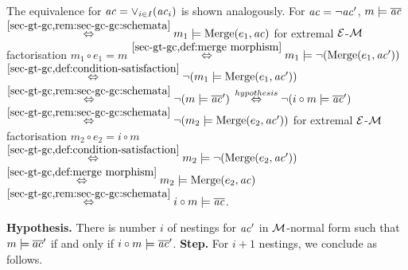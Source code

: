 \begin{description}
The equivalence for $\mathit{ac}=\vee_{i \in I}(\mathit{ac}_i)$ is shown analogously.
For $\mathit{ac}=\neg \mathit{ac}'$, $m \models \overline{\mathit{ac}}$ $\stackrel{\cref{sec-gt-gc,rem:sec-gc-gc:schemata}}{\Leftrightarrow} m_1 \models \Merge(e_1,\ac)$ for extremal $\mathcal{E}$-${\cal M}$ factorisation $m_1 \circ e_1=m$ $\stackrel{\cref{sec-gt-gc,def:merge morphism}}{\Leftrightarrow} m_1 \models \neg(\Merge(e_1,\ac'))$ $\stackrel{\cref{sec-gt-gc,def:condition-satisfaction}}{\Leftrightarrow} \neg(m_1 \models \Merge(e_1,\ac'))$ $\stackrel{\cref{sec-gt-gc,rem:sec-gc-gc:schemata}}{\Leftrightarrow} \neg(m \models \ol{\ac}')$ $\stackrel{hypothesis}{\Leftrightarrow} \neg(i \circ m \models \overline{\mathit{ac}}')$
$\stackrel{\cref{sec-gt-gc,rem:sec-gc-gc:schemata}}{\Leftrightarrow} \neg(m_2 \models \Merge(e_2,\ac'))$ for extremal $\mathcal{E}$-${\cal M}$ factorisation $m_2 \circ e_2=i \circ m$ $\stackrel{\cref{sec-gt-gc,def:condition-satisfaction}}{\Leftrightarrow} m_2 \models \neg(\Merge(e_2,\ac'))$ $\stackrel{\cref{sec-gt-gc,def:merge morphism}}{\Leftrightarrow} m_2 \models \Merge(e_2,\ac)$ $\stackrel{\cref{sec-gt-gc,rem:sec-gc-gc:schemata}}{\Leftrightarrow} i \circ m \models \ol{\ac}$.
\end{description}
\textbf{Hypothesis.} There is number $i$ of nestings for $\mathit{ac}'$ in ${\cal M}$-normal form such that $m \models \overline{ac}'$ if and only if $i \circ m \models \overline{\mathit{ac}}'$.
\textbf{Step.} For $i+1$ nestings, we conclude as follows.
